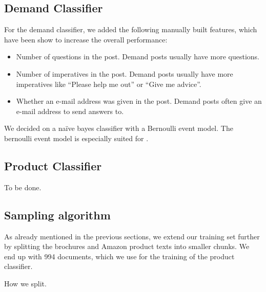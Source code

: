 \subsection{Demand Classifier}
For the demand classifier, we added the following manually built features, which have been show to increase the overall performance:
\begin{itemize}
	\item Number of questions in the post. Demand posts usually have more questions.
	\item Number of imperatives in the post. Demand posts usually have more imperatives like ``Please help me out'' or ``Give me advice''.
	\item Whether an e-mail address was given in the post. Demand posts often give an e-mail address to send answers to.
\end{itemize}

We decided on a na\"{i}ve bayes classifier with a Bernoulli event model.
The bernoulli event model is especially suited for .

\subsection{Product Classifier}
To be done.

\subsection{Sampling algorithm}
As already mentioned in the previous sections, we extend our training set further by splitting the brochures and Amazon product texts into smaller chunks.
We end up with 994 documents, which we use for the training of the product classifier.

How we split.
